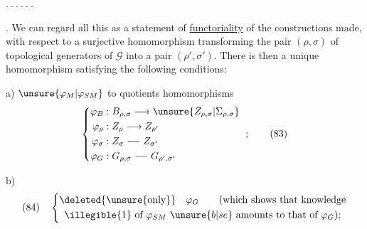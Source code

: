 \hfill $.\ .\ .\ .\ .\ .$ 


. We can regard all this as a statement of \uline{functoriality} of the constructions made, with respect to a surjective homomorphism
transforming the pair $(\rho,\sigma)$ of topological generators of $\mathcal G$ into a pair $(\rho',\sigma')$.
There is then a unique homomorphism
satisfying the following conditions:

a) $\unsure{\varphi_M|\varphi_{SM}}$  to quotients  homomorphisms
\[
\left\{\begin{aligned}
\varphi_B&:B_{\rho,\sigma}\longrightarrow\unsure{Z_{\rho,\sigma}|\Sigma_{\rho,\sigma}}\\
\varphi_\rho&:Z_\rho\longrightarrow Z_{\rho'}\\
\varphi_\sigma&:Z_\sigma\mathrel{\relbar\joinrel\relbar} Z_{\sigma'}\\
\varphi_G&:G_{\rho,\sigma}\mathrel{\relbar\joinrel\relbar} G_{\rho',\sigma'}
\end{aligned}\right.\ ;\qquad(83)
\]

b) 
\[
(84)\quad\left\{\begin{gathered}
\deleted{\text{\unsure{only}}}\quad\varphi_G\qquad
\text{(which shows that knowledge}\\
\text{\illegible{1} of }\varphi_{SM}\ \unsure{b|se}\ \text{amounts to that of }\varphi_G\text{)};
\end{gathered}\right.
\]

